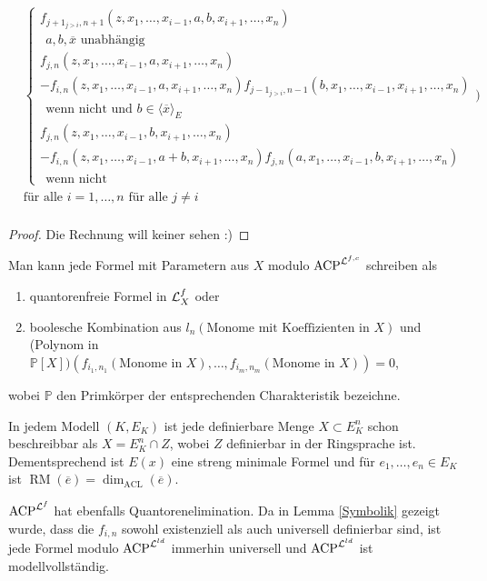 \begin{lemma}
\begin{align*}
    	&\left\{\begin{array}{ll}
    	f_{j+1_{j>i},n+1}(z,x_1,\dots,x_{i-1},a,b,x_{i+1},\dots,x_n)\\
    	\ \ a,b,\overline{x}\text{ unabhängig}\\
    	f_{j,n}(z,x_1,\dots,x_{i-1},a,x_{i+1},\dots,x_n)\\
    	-f_{i,n}(z,x_1,\dots,x_{i-1},a,x_{i+1},\dots,x_n)f_{j-1_{j>i},n-1}(b,x_1,\dots,x_{i-1},x_{i+1},\dots,x_n)\\
    	\ \ \text{wenn nicht und }b\in\langle\overline{x}\rangle_E\\
    	f_{j,n}(z,x_1,\dots,x_{i-1},b,x_{i+1},\dots,x_n)\\
    	-f_{i,n}(z,x_1,\dots,x_{i-1},a+b,x_{i+1},\dots,x_n)f_{j,n}(a,x_1,\dots,x_{i-1},b,x_{i+1},\dots,x_n)\\
    	\ \ \text{wenn nicht}
    	\end{array}\right.)\\
    	&\text{für alle }i=1,\dots,n\text{ für alle }j\neq i\\
    	\end{align*}
    \end{lemma}
    \begin{proof}
    	Die Rechnung will keiner sehen :)
    \end{proof}
    
    \begin{corollary}\label{Formel-Vereinfachung}
    	Man kann jede Formel mit Parametern aus $X$ modulo $\operatorname{ACP}^{\mathcal{L}^{f,c}}$ schreiben als
    	\begin{enumerate}
    		\item quantorenfreie Formel in $\mathcal{L}^f_X$ oder
    		\item boolesche Kombination aus \glqq{}$l_n(\text{Monome mit Koeffizienten in }X)$\grqq{} und\\
    		\glqq{}(Polynom in $\mathbb{P}[X])(f_{i_1,n_1}(\text{Monome in }X),\dots,f_{i_m,n_m}(\text{Monome in }X))=0$\grqq{},
    	\end{enumerate}
        wobei $\mathbb{P}$ den Primkörper der entsprechenden Charakteristik bezeichne.
    \end{corollary}
    \begin{corollary}
    	In jedem Modell $(K,E_K)$ ist jede definierbare Menge $X\subset E_K^n$ schon beschreibbar als $X=E_K^n\cap Z$, wobei $Z$ definierbar in der Ringsprache ist. Dementsprechend ist $E(x)$ eine streng minimale Formel und für $e_1,\dots,e_n\in E_K$ ist $\operatorname{RM}(\overline{e})=\dim_{\operatorname{ACL}}(\overline{e})$.
    \end{corollary}
    \begin{corollary}
    	$\operatorname{ACP}^{\mathcal{L}^f}$ hat ebenfalls Quantorenelimination. Da in Lemma \ref{Symbolik} gezeigt wurde, dass die $f_{i,n}$ sowohl existenziell als auch universell definierbar sind, ist jede Formel modulo $\operatorname{ACP}^{\mathcal{L}^{ld}}$ immerhin universell und $\operatorname{ACP}^{\mathcal{L}^{ld}}$ ist modellvollständig.
    \end{corollary}
    
